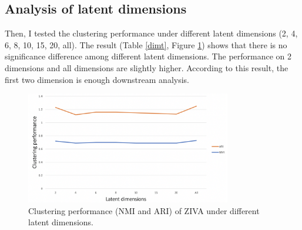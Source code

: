 \subsection{Analysis of latent dimensions}
Then, I tested the clustering performance under different latent dimensions (2, 4, 6, 8, 10, 15, 20, all). The result (Table \ref{dimt}, Figure \ref{dim}) shows that there is no significance difference among different latent dimensions. The performance on 2 dimensions and all dimensions are slightly higher. According to this result, the first two dimension is enough downstream analysis.
\begin{figure}[htb!]
    \centering
    \includegraphics[width=0.8\textwidth]{figures/myfigures/dim.png}
    \caption{Clustering performance (NMI and ARI) of ZIVA under different latent dimensions.}
    \label{dim}
\end{figure}
